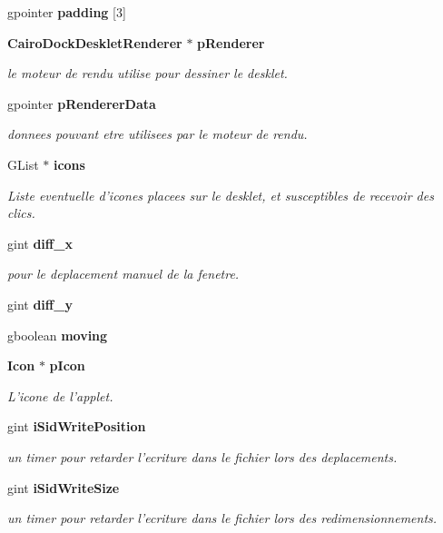 \begin{CompactItemize}
gpointer {\bf padding} [3]
\item 
{\bf CairoDockDeskletRenderer} $\ast$ {\bf pRenderer}
\begin{CompactList}\small\item\em le moteur de rendu utilise pour dessiner le desklet. \item\end{CompactList}\item 
gpointer {\bf pRendererData}
\begin{CompactList}\small\item\em donnees pouvant etre utilisees par le moteur de rendu. \item\end{CompactList}\item 
GList $\ast$ {\bf icons}
\begin{CompactList}\small\item\em Liste eventuelle d'icones placees sur le desklet, et susceptibles de recevoir des clics. \item\end{CompactList}\item 
gint {\bf diff\_\-x}
\begin{CompactList}\small\item\em pour le deplacement manuel de la fenetre. \item\end{CompactList}\item 
gint {\bf diff\_\-y}
\item 
gboolean {\bf moving}
\item 
{\bf Icon} $\ast$ {\bf pIcon}
\begin{CompactList}\small\item\em L'icone de l'applet. \item\end{CompactList}\item 
gint {\bf iSidWritePosition}
\begin{CompactList}\small\item\em un timer pour retarder l'ecriture dans le fichier lors des deplacements. \item\end{CompactList}\item 
gint {\bf iSidWriteSize}
\begin{CompactList}\small\item\em un timer pour retarder l'ecriture dans le fichier lors des redimensionnements. \item\end{CompactList}\item 

\end{CompactItemize}
